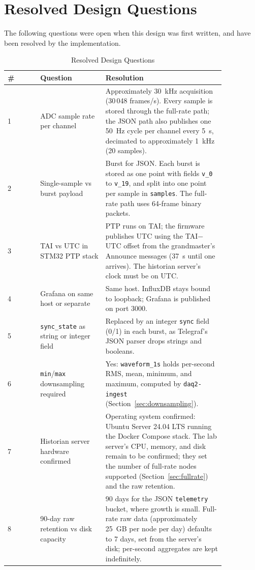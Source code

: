 \section{Resolved Design Questions}
The following questions were open when this design was first written, and have been resolved by the implementation.

\begin{table}[H]
\centering
\caption{Resolved Design Questions}
\begin{tabular}{lp{0.3\linewidth}p{0.55\linewidth}}
\hline
\textbf{\#} & \textbf{Question} & \textbf{Resolution} \\
\hline
1 & ADC sample rate per channel & Approximately 30~kHz acquisition (30\,048 frames/s). Every sample is stored through the full-rate path; the JSON path also publishes one 50~Hz cycle per channel every 5~s, decimated to approximately 1~kHz (20 samples). \\
2 & Single-sample vs burst payload & Burst for JSON. Each burst is stored as one point with fields \texttt{v\_0} to \texttt{v\_19}, and split into one point per sample in \texttt{samples}. The full-rate path uses 64-frame binary packets. \\
3 & TAI vs UTC in STM32 PTP stack & PTP runs on TAI; the firmware publishes UTC using the TAI$-$UTC offset from the grandmaster's Announce messages (37~s until one arrives). The historian server's clock must be on UTC. \\
4 & Grafana on same host or separate & Same host. InfluxDB stays bound to loopback; Grafana is published on port 3000. \\
5 & \texttt{sync\_state} as string or integer field & Replaced by an integer \texttt{sync} field (0/1) in each burst, as Telegraf's JSON parser drops strings and booleans. \\
6 & \texttt{min}/\texttt{max} downsampling required & Yes: \texttt{waveform\_1s} holds per-second RMS, mean, minimum, and maximum, computed by \texttt{daq2-ingest} (Section~\ref{sec:downsampling}). \\
7 & Historian server hardware confirmed & Operating system confirmed: Ubuntu Server 24.04 LTS running the Docker Compose stack. The lab server's CPU, memory, and disk remain to be confirmed; they set the number of full-rate nodes supported (Section~\ref{sec:fullrate}) and the raw retention. \\
8 & 90-day raw retention vs disk capacity & 90 days for the JSON \texttt{telemetry} bucket, where growth is small. Full-rate raw data (approximately 25~GB per node per day) defaults to 7 days, set from the server's disk; per-second aggregates are kept indefinitely. \\
\hline
\end{tabular}
\end{table}
